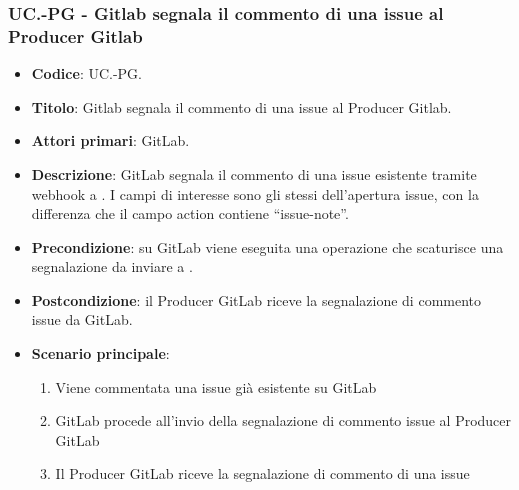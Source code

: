 \subsubsection{UC\theuccount.\thesubuccount-PG - Gitlab segnala il commento di una issue al Producer Gitlab}
\begin{itemize}
    \item \textbf{Codice}: UC\theuccount.\thesubuccount-PG.
    \item \textbf{Titolo}: Gitlab segnala il commento di una issue al Producer Gitlab.
    \item \textbf{Attori primari}: GitLab.
    \item \textbf{Descrizione}: GitLab segnala il commento di una issue esistente tramite webhook a \progetto.
    I campi di interesse sono gli stessi dell'apertura issue, con la differenza che il campo action contiene ``issue-note''.
    \item \textbf{Precondizione}: su GitLab viene eseguita una operazione che scaturisce una
    segnalazione da inviare a \progetto.
    \item \textbf{Postcondizione}: il Producer GitLab riceve la segnalazione di commento issue da GitLab.
    \item \textbf{Scenario principale}:
    \begin{enumerate}
        \item Viene commentata una issue già esistente su GitLab
        \item GitLab procede all'invio della segnalazione di commento issue al Producer GitLab
        \item Il Producer GitLab riceve la segnalazione di commento di una issue
    \end{enumerate}

\end{itemize}


